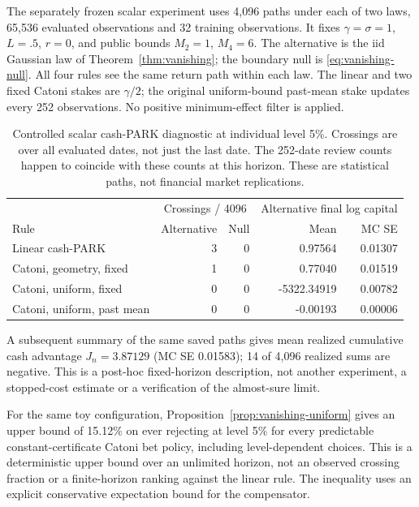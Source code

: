 The separately frozen scalar experiment uses 4,096 paths under each of two laws, 65,536 evaluated observations and 32 training observations. It fixes $\gamma=\sigma=1$, $L=.5$, $r=0$, and public bounds $M_2=1$, $M_4=6$. The alternative is the iid Gaussian law of Theorem~\ref{thm:vanishing}; the boundary null is \eqref{eq:vanishing-null}. All four rules see the same return path within each law. The linear and two fixed Catoni stakes are $\gamma/2$; the original uniform-bound past-mean stake updates every 252 observations. No positive minimum-effect filter is applied.

\begin{table}[H]\centering\small

\begin{tabular}{lrrrr}\toprule

& \multicolumn{2}{c}{Crossings / 4096} & \multicolumn{2}{c}{Alternative final log capital} \\

Rule & Alternative & Null & Mean & MC SE \\\midrule

Linear cash-PARK & 3 & 0 & 0.97564 & 0.01307 \\

Catoni, geometry, fixed & 1 & 0 & 0.77040 & 0.01519 \\

Catoni, uniform, fixed & 0 & 0 & -5322.34919 & 0.00782 \\

Catoni, uniform, past mean & 0 & 0 & -0.00193 & 0.00006 \\

\bottomrule\end{tabular}

\caption{Controlled scalar cash-PARK diagnostic at individual level 5\%. Crossings are over all evaluated dates, not just the last date. The 252-date review counts happen to coincide with these counts at this horizon. These are statistical paths, not financial market replications.}\label{tab:vanishing}\end{table}

A subsequent summary of the same saved paths gives mean realized cumulative cash advantage $J_n=3.87129$ (MC SE 0.01583); 14 of 4,096 realized sums are negative. This is a post-hoc fixed-horizon description, not another experiment, a stopped-cost estimate or a verification of the almost-sure limit.

For the same toy configuration, Proposition~\ref{prop:vanishing-uniform} gives an upper bound of 15.12\% on ever rejecting at level 5\% for every predictable constant-certificate Catoni bet policy, including level-dependent choices. This is a deterministic upper bound over an unlimited horizon, not an observed crossing fraction or a finite-horizon ranking against the linear rule. The inequality uses an explicit conservative expectation bound for the compensator.

